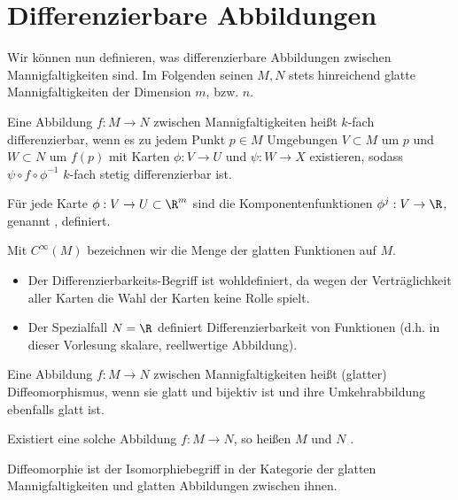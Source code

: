 \chapter{Differenzierbare Abbildungen}


Wir können nun definieren, was differenzierbare Abbildungen zwischen Mannigfaltigkeiten sind.
Im Folgenden seinen $M, N$ stets hinreichend glatte Mannigfaltigkeiten der Dimension $m$, bzw. $n$.

\begin{df} \label{2.1}
    Eine Abbildung $f: M \to N$ zwischen Mannigfaltigkeiten heißt $k$-fach differenzierbar, wenn es zu jedem Punkt $p \in M$ Umgebungen $V \subset M$ um $p$ und $W \subset N$ um $f(p)$ mit Karten $\phi: V \to U$ und $\psi: W \to X$ existieren, sodass
    \begin{math}
        \psi \circ f \circ \phi^{-1}
    \end{math}
    $k$-fach stetig differenzierbar ist.

    Für jede Karte $\phi: V \to U \subset \R^m$ sind die Komponentenfunktionen $\phi^j: V \to \R$, genannt , definiert.

    Mit $C^\infty(M)$ bezeichnen wir die Menge der glatten Funktionen auf $M$.
    \begin{note}
        \begin{itemize}
            \item
                Der Differenzierbarkeits-Begriff ist wohldefiniert, da wegen der Verträglichkeit aller Karten die Wahl der Karten keine Rolle spielt.
            \item
                Der Spezialfall $N = \R$ definiert Differenzierbarkeit von Funktionen (d.h. in dieser Vorlesung skalare, reellwertige Abbildung).
        \end{itemize}
    \end{note}
\end{df}

\begin{df} \label{2.2}
    Eine Abbildung $f: M \to N$ zwischen Mannigfaltigkeiten heißt (glatter) Diffeomorphismus, wenn sie glatt und bijektiv ist und ihre Umkehrabbildung ebenfalls glatt ist.

    Existiert eine solche Abbildung $f: M \to N$, so heißen $M$ und $N$ .
    \begin{note}
        Diffeomorphie ist der Isomorphiebegriff in der Kategorie der glatten Mannigfaltigkeiten und glatten Abbildungen zwischen ihnen.
    \end{note}
\end{df}


